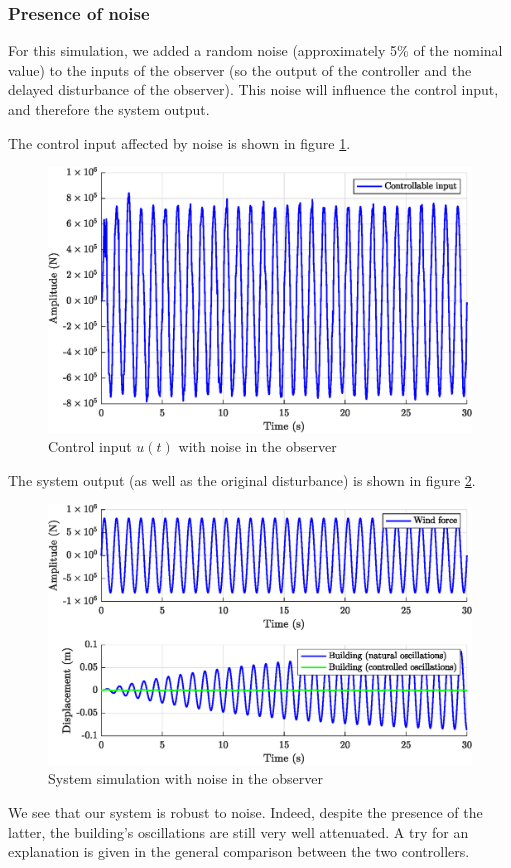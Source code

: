 \subsubsection{Presence of noise}
For this simulation, we added a random noise (approximately 5\% of the nominal value) to the inputs of the observer (so the output of the controller and the delayed disturbance of the observer). This noise will influence the control input, and therefore the system output.\par
The control input affected by noise is shown in figure \ref{fig:3.noise.control.input}.
\begin{figure}[H]
    \centering
    \includegraphics[width=\textwidth]{resources/eps/3_noise-controllable-input.eps}
    \caption{Control input $u(t)$ with noise in the observer}
    \label{fig:3.noise.control.input}
\end{figure}
The system output (as well as the original disturbance) is shown in figure \ref{fig:3.noise}.
\begin{figure}[H]
    \centering
    \includegraphics[width=\textwidth]{resources/eps/3_noise.eps}
    \caption{System simulation with noise in the observer}
    \label{fig:3.noise}
\end{figure}
We see that our system is robust to noise. Indeed, despite the presence of the latter, the building's oscillations are still very well attenuated. A try for an explanation is given in the general comparison between the two controllers.
